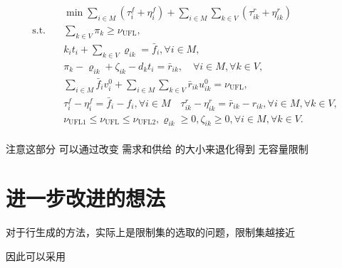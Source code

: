 \documentclass[UTF8]{article}
\begin{document}
\begin{equation}
\begin{aligned}
&\min \sum_{i \in M} \left(\tau_{i}^{f}+\eta_{i}^{f}\right)+\sum_{i \in M} \sum_{k \in V} \left(\tau_{i k}^r+\eta_{i k}^{r}\right) \\
\text{s.t.} \quad &\sum_{k \in V} \pi_{k} \geq \nu_{\mathrm{UFL}}, \\
&k_it_i+\sum_{k \in V} \varrho_{i k}=\bar{f}_{i}, \forall i \in M, \\
&\pi_{k}-\varrho_{i k}+\zeta_{i k}-d_kt_i=\bar{r}_{i k}, \quad \forall i \in M, \forall k \in V, \\
&\sum_{i \in M} \bar{f}_{i} v_{i}^{0}+\sum_{i \in M} \sum_{k \in V} \bar{r}_{i k} u_{i k}^{0}=\nu_{\mathrm{UFL}}, \\
& \tau_{i}^{f}-\eta_{i}^{f}=\bar{f}_{i}-f_{i}, \forall i \in M \quad \tau_{i k}^{r}-\eta_{i k}^{r}=\bar{r}_{i k}-r_{i k}, \forall i \in M, \forall k \in V, \\
&\nu_{\mathrm{UFL} 1} \leq \nu_{\mathrm{UFL}} \leq \nu_{\mathrm{UFL} 2}, \varrho_{i k} \geq 0, \zeta_{i k} \geq 0, \forall i \in M, \forall k \in V. \\
\end{aligned}
\end{equation}

注意这部分 可以通过改变 需求和供给 的大小来退化得到 无容量限制

\section{进一步改进的想法}
对于行生成的方法，实际上是限制集的选取的问题，限制集越接近

因此可以采用
\end{document}
